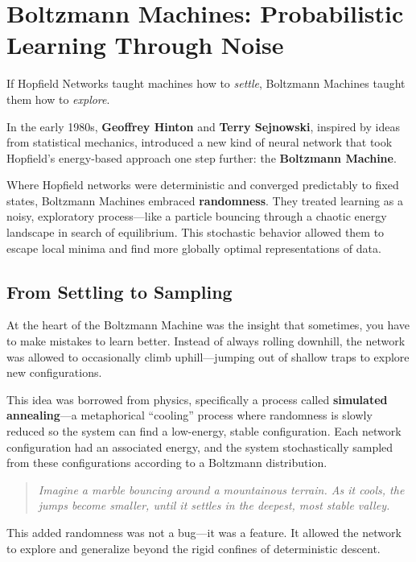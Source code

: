 \section{Boltzmann Machines: Probabilistic Learning Through Noise}

If Hopfield Networks taught machines how to \emph{settle}, Boltzmann Machines taught them how to \emph{explore}.

In the early 1980s, \textbf{Geoffrey Hinton} and \textbf{Terry Sejnowski}, inspired by ideas from statistical mechanics, introduced a new kind of neural network that took Hopfield’s energy-based approach one step further: the \textbf{Boltzmann Machine}.

Where Hopfield networks were deterministic and converged predictably to fixed states, Boltzmann Machines embraced \textbf{randomness}. They treated learning as a noisy, exploratory process—like a particle bouncing through a chaotic energy landscape in search of equilibrium. This stochastic behavior allowed them to escape local minima and find more globally optimal representations of data.

\subsection{From Settling to Sampling}

At the heart of the Boltzmann Machine was the insight that sometimes, you have to make mistakes to learn better. Instead of always rolling downhill, the network was allowed to occasionally climb uphill—jumping out of shallow traps to explore new configurations.

This idea was borrowed from physics, specifically a process called \textbf{simulated annealing}—a metaphorical “cooling” process where randomness is slowly reduced so the system can find a low-energy, stable configuration. Each network configuration had an associated energy, and the system stochastically sampled from these configurations according to a Boltzmann distribution.

\begin{quote}
\textit{Imagine a marble bouncing around a mountainous terrain. As it cools, the jumps become smaller, until it settles in the deepest, most stable valley.}
\end{quote}

This added randomness was not a bug—it was a feature. It allowed the network to explore and generalize beyond the rigid confines of deterministic descent.

